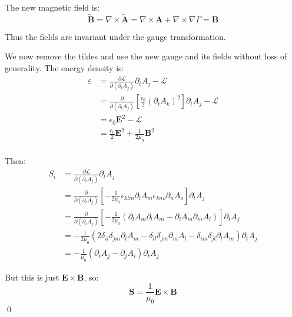 \documentclass[12pt]{article}
\begin{document}
The new magnetic field is:
\begin{equation}
    \tilde{\mathbf{B}} = \nabla \times \tilde{\mathbf{A}} = \nabla \times \mathbf{A} + \nabla \times \nabla \Gamma = \mathbf{B}
\end{equation}

Thus the fields are invariant under the gauge transformation.

We now remove the tildes and use the new gauge and its fields without loss of generality. The energy density is:
\begin{equation}
    \begin{split}
        \varepsilon &= \frac{\partial \mathcal{L}}{\partial (\partial_{t} A_{j})} \partial_{t} A_{j} - \mathcal{L} \\
        &= \frac{\partial}{\partial (\partial_{t} A_{j})} \left[ \frac{\epsilon_{0}}{2} (\partial_{t} A_{k})^{2} \right] \partial_{t} A_{j} - \mathcal{L} \\
        &= \epsilon_{0} \mathbf{E}^{2} - \mathcal{L} \\
        &= \frac{\epsilon_{0}}{2} \mathbf{E}^{2} + \frac{1}{2\mu_{0}} \mathbf{B}^{2} \\
    \end{split}
\end{equation}

Then:
\begin{equation}
    \begin{split}
        S_{i} &= \frac{\partial \mathcal{L}}{\partial (\partial_{i} A_{j})} \partial_{t} A_{j} \\
        &= \frac{\partial}{\partial (\partial_{i} A_{j})} \left[ -\frac{1}{2\mu_{0}} \epsilon_{klm} \partial_{l} A_{m} \epsilon_{kno} \partial_{n} A_{o} \right] \partial_{t} A_{j} \\
        &= \frac{\partial}{\partial (\partial_{i} A_{j})} \left[ -\frac{1}{2\mu_{0}} (\partial_{l} A_{m} \partial_{l} A_{m} - \partial_{l} A_{m} \partial_{m} A_{l}) \right] \partial_{t} A_{j} \\
        &= -\frac{1}{2\mu_{0}} \left( 2\delta_{il} \delta_{jm} \partial_{l} A_{m} - \delta_{il} \delta_{jm} \partial_{m} A_{l} - \delta_{im} \delta_{jl} \partial_{l} A_{m} \right) \partial_{t} A_{j} \\
        &= -\frac{1}{\mu_{0}} (\partial_{i} A_{j} - \partial_{j} A_{i}) \partial_{t} A_{j}
    \end{split}
\end{equation}

But this is just $\mathbf{E} \times \mathbf{B}$, so:
\begin{equation}
    \mathbf{S} = \frac{1}{\mu_{0}}\mathbf{E} \times \mathbf{B}
\end{equation}
\qed
\end{document}
